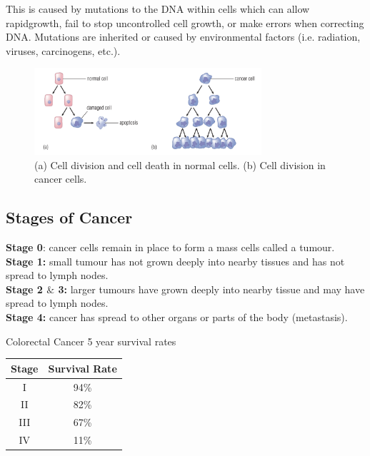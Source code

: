 \documentclass[12pt]{report}
\begin{document}
This is caused by mutations to the DNA within cells which can allow rapidgrowth, fail to stop uncontrolled cell growth, or make errors when correcting DNA. Mutations are inherited or caused by environmental factors (i.e. radiation, viruses, carcinogens, etc.).

\begin{figure}[H]
\centering
    \includegraphics[width=0.75\textwidth]{../figures/cancer.png}
    \caption{(a) Cell division and cell death in normal cells. (b) Cell division in cancer cells.}
    \label{fig:cancer}
\end{figure}

\subsection{Stages of Cancer}
\textbf{Stage 0}: cancer cells remain in place to form a mass cells called a tumour.\\ 
\textbf{Stage 1:} small tumour has not grown deeply into nearby tissues and has not spread to lymph nodes.\\ 
\textbf{Stage 2 $\&$ 3:} larger tumours have grown deeply into nearby tissue and may have spread to lymph nodes.\\
\textbf{Stage 4:} cancer has spread to other organs or parts of the body (metastasis).

\begin{table}[h!] %

    \renewcommand{\arraystretch}{1.5} %
    \setlength{\tabcolsep}{10pt} %
    \setlength{\arrayrulewidth}{0.25mm}

    \begin{center}
        Colorectal Cancer 5 year survival rates \\
        \vspace{0.5em}
        \begin{tabular}{|c c|} %
        \hline
        Stage & Survival Rate \\ %
        \hline
        I & 94\% \\ %
        \hline
        II & 82\%\\ 
        \hline 
        III & 67\% \\ 
        \hline 
        IV & 11\%\\ 
        \hline
        \end{tabular}
    \end{center}
\end{table}
\end{document}
